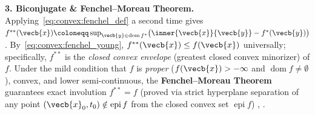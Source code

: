 \documentclass[../../../../master.tex]{subfiles}
\begin{document}
\begin{coremath}
\textbf{3. Biconjugate \& Fenchel--Moreau Theorem.} Applying~\eqref{eq:convex:fenchel_def} a second time gives $f^{**}(\vecb{x}) \coloneqq \sup_{\vecb{y} \in \operatorname{dom} f^*} \bigl(\inner{\vecb{x}}{\vecb{y}} - f^*(\vecb{y})\bigr)$. By~\eqref{eq:convex:fenchel_young}, $f^{**}(\vecb{x}) \le f(\vecb{x})$ universally; specifically, $f^{**}$ is the \emph{closed convex envelope} (greatest closed convex minorizer) of $f$. Under the mild condition that $f$ is \emph{proper} ($f(\vecb{x}) > -\infty$ and $\operatorname{dom} f \neq \emptyset$), convex, and lower semi-continuous, the \textbf{Fenchel--Moreau Theorem} guarantees exact involution $f^{**} = f$ (proved via strict hyperplane separation of any point $(\vecb{x}_0, t_0) \notin \operatorname{epi} f$ from the closed convex set $\operatorname{epi} f$) , .


\end{coremath}
\end{document}

